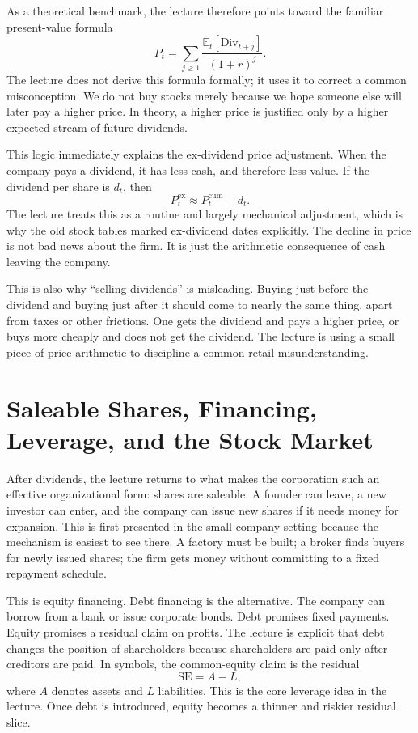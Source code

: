 As a theoretical benchmark, the lecture therefore points toward the familiar present-value formula
\begin{equation}
P_t=\sum_{j\ge 1}\frac{\mathbb{E}_t[\mathrm{Div}_{t+j}]}{(1+r)^j}.
\end{equation}
The lecture does not derive this formula formally; it uses it to correct a common misconception. We do not buy stocks merely because we hope someone else will later pay a higher price. In theory, a higher price is justified only by a higher expected stream of future dividends.

This logic immediately explains the ex-dividend price adjustment. When the company pays a dividend, it has less cash, and therefore less value. If the dividend per share is $d_t$, then
\begin{equation}
P_t^{\mathrm{ex}}\approx P_t^{\mathrm{cum}}-d_t.
\end{equation}
The lecture treats this as a routine and largely mechanical adjustment, which is why the old stock tables marked ex-dividend dates explicitly. The decline in price is not bad news about the firm. It is just the arithmetic consequence of cash leaving the company.

This is also why ``selling dividends'' is misleading. Buying just before the dividend and buying just after it should come to nearly the same thing, apart from taxes or other frictions. One gets the dividend and pays a higher price, or buys more cheaply and does not get the dividend. The lecture is using a small piece of price arithmetic to discipline a common retail misunderstanding.

\section{Saleable Shares, Financing, Leverage, and the Stock Market}

After dividends, the lecture returns to what makes the corporation such an effective organizational form: shares are saleable. A founder can leave, a new investor can enter, and the company can issue new shares if it needs money for expansion. This is first presented in the small-company setting because the mechanism is easiest to see there. A factory must be built; a broker finds buyers for newly issued shares; the firm gets money without committing to a fixed repayment schedule.

This is equity financing. Debt financing is the alternative. The company can borrow from a bank or issue corporate bonds. Debt promises fixed payments. Equity promises a residual claim on profits. The lecture is explicit that debt changes the position of shareholders because shareholders are paid only after creditors are paid. In symbols, the common-equity claim is the residual
\begin{equation}
\mathrm{SE}=A-L,
\end{equation}
where $A$ denotes assets and $L$ liabilities. This is the core leverage idea in the lecture. Once debt is introduced, equity becomes a thinner and riskier residual slice.

